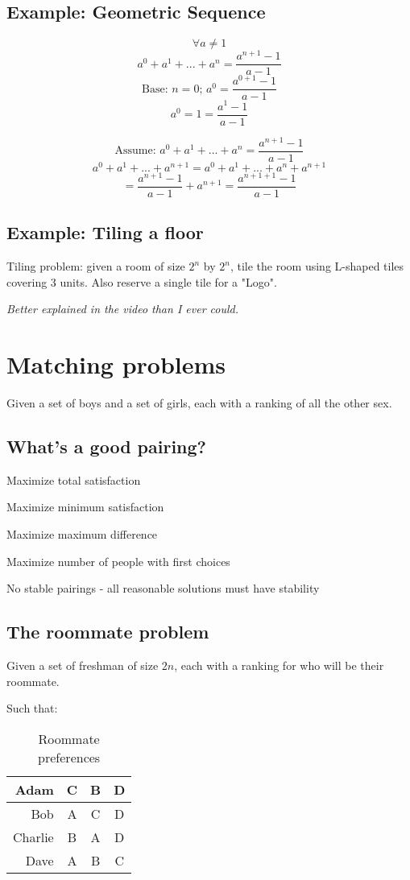 \documentclass[a4paper]{article}
\newenvironment{itemize*}%
  {\begin{itemize}%
    \setlength{\itemsep}{0pt}%
    \setlength{\parsep}{0pt}%
    \setlength{\parskip}{0pt}}%
  {\end{itemize}}
\begin{document}
\subsection{Example: Geometric Sequence}
\[\forall a \ne 1\]
\[a^0+a^1+...+a^n = \frac{a^{n+1}-1}{a-1}\]
\[\text{Base: }n=0\text{; }a^0 = \frac{a^{0+1}-1}{a-1}\]
\[a^0=1=\frac{a^1-1}{a-1}\]

\[\text{Assume: }a^0+a^1+...+a^n=\frac{a^{n+1}-1}{a-1}\]
\[a^0 + a^1 + ... + a^{n+1} = a^0 + a^1 + ... + a^n + a^{n+1}\]
\[= \frac{a^{n+1} - 1}{a - 1} + a^{n+1} = \frac{a^{n+1+1} - 1}{a - 1}\]

\subsection{Example: Tiling a floor}
Tiling problem: given a room of size $2^n$ by $2^n$, tile the room using L-shaped tiles covering 3 units. Also reserve a single tile for a "Logo".

{\it Better explained in the video than I ever could.}

\section{Matching problems}
Given a set of boys and a set of girls, each with a ranking of all the other sex.

\subsection{What's a good pairing?}

\begin{itemize*}
\item Maximize total satisfaction
\item Maximize minimum satisfaction
\item Maximize maximum difference
\item Maximize number of people with first choices
\item No stable pairings - all reasonable solutions must have stability
\end{itemize*}

\subsection{The roommate problem}
Given a set of freshman of size $2n$, each with a ranking for who will be their roommate.

Such that:
\begin{table}[h!]
  \centering
  \caption{Roommate preferences}
  \label{tab:table1}
  \begin{tabular}{r|c|c|c}
    Adam & C & B & D\\
    \hline
    Bob & A & C & D\\
    \hline
    Charlie & B & A & D\\
    \hline
    Dave & A & B & C\\
  \end{tabular}
\end{table}
\end{document}
